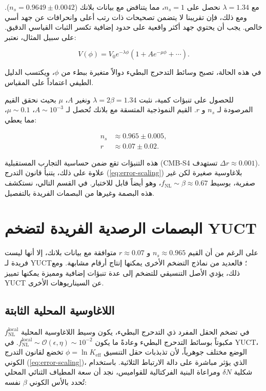 \documentclass[11pt,a4paper]{article}
\theoremstyle{remark}
\newcommand{\Keff}{K_{\mathrm{eff}}}
\newcommand{\rs}{r}
\begin{document}
	مع $\lambda = 1.34$ نحصل على $n_s = 1$، مما يتناقض مع بيانات بلانك ($n_s = 0.9649 \pm 0.0042$). ومع ذلك، فإن تقريبنا لا يتضمن تصحيحات ذات رتب أعلى وانحرافات عن جهد أسي خالص. يجب أن يحتوي جهد أكثر واقعية على حدود إضافية تكسر الثبات القياسي الدقيق. على سبيل المثال، نعتبر:
	
	\begin{equation}
		V(\phi) = V_0 e^{-\lambda \phi} \left(1 + A e^{-\mu \phi} + \cdots \right).
	\end{equation}
	
	في هذه الحالة، تصبح وسائط التدحرج البطيء دوالاً متغيرة ببطء من $\phi$، ويكتسب الدليل الطيفي اعتماداً على المقياس.
	
	للحصول على تنبؤات كمية، نثبت $\lambda = 2\beta = 1.34$ ونغير $A$، $\mu$ بحيث نحقق القيم المرصودة لـ $n_s$ و $\rs$. القيم النموذجية المتسقة مع بلانك تُحصل لـ $A \sim 10^{-3}$، $\mu \sim 0.1$، مما يعطي:
	
	\begin{align}
		n_s &\approx 0.965 \pm 0.005, \\
		\rs &\approx 0.07 \pm 0.02.
	\end{align}
	
	هذه التنبؤات تقع ضمن حساسية التجارب المستقبلية (CMB‑S4 تستهدف $\Delta r \approx 0.001$). علاوة على ذلك، يتنبأ قانون التدرج (\ref{eq:error-scaling}) بلاغاوسية صغيرة لكن غير صفرية، بوسيط $f_{\mathrm{NL}} \sim \beta \approx 0.67$، وهو أيضاً قابل للاختبار. في القسم التالي، نستكشف هذه البصمة وغيرها من البصمات الفريدة بالتفصيل.
	
	\section{البصمات الرصدية الفريدة لتضخم YUCT}
	\label{sec:signatures}
	
	على الرغم من أن القيم $n_s \approx 0.965$ و $r \approx 0.07$ متوافقة مع بيانات بلانك، إلا أنها ليست فريدة لـ YUCT؛ فالعديد من نماذج التضخم الأخرى يمكنها إنتاج أرقام مشابهة. ومع ذلك، يؤدي الأصل التنسيقي للتضخم إلى عدة تنبؤات إضافية ومميزة يمكنها تمييز YUCT عن السيناريوهات الأخرى.
	
	\subsection{اللاغاوسية المحلية الثابتة}
	
	في تضخم الحقل المفرد ذي التدحرج البطيء، يكون وسيط اللاغاوسية المحلية $f_{\text{NL}}^{\text{local}}$ مكبوتاً بوسائط التدحرج البطيء وعادةً ما يكون $f_{\text{NL}}^{\text{local}} \sim \mathcal{O}(\epsilon, \eta) \sim 10^{-2}$. في YUCT، الوضع مختلف جوهرياً، لأن تذبذبات حقل التنسيق $\phi = \ln \Keff$ تخضع لقانون التدرج الكوني (\ref{eq:error-scaling})، الذي يؤثر مباشرة على دالة الارتباط الثلاثية. باستخدام شكلية $\delta N$ ومراعاة البنية الفركتالية للقواميس، نجد أن سعة المطياف الثنائي المحلي تُحدد بالأس الكوني $\beta$ نفسه:
	
\end{document}
